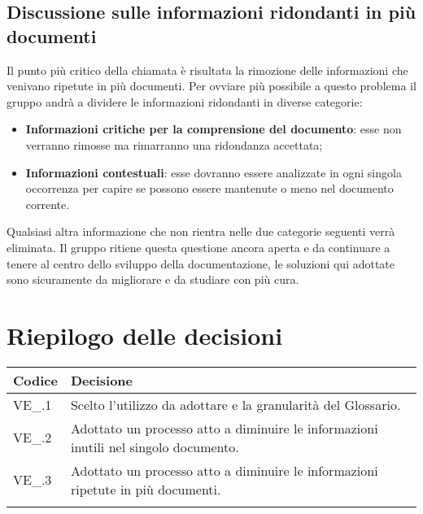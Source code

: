 \subsection{Discussione sulle informazioni ridondanti in più documenti}
Il punto più critico della chiamata è risultata la rimozione delle informazioni che venivano ripetute in più documenti. Per ovviare più possibile a questo problema il gruppo andrà a dividere le informazioni ridondanti in diverse categorie:
\begin{itemize}
	\item \textbf{Informazioni critiche per la comprensione del documento}: esse non verranno rimosse ma rimarranno una ridondanza accettata;
	\item \textbf{Informazioni contestuali}: esse dovranno essere analizzate in ogni singola occorrenza per capire se possono essere mantenute o meno nel documento corrente.
\end{itemize}
Qualsiasi altra informazione che non rientra nelle due categorie seguenti verrà eliminata.\newline
Il gruppo ritiene questa questione ancora aperta e da continuare a tenere al centro dello sviluppo della documentazione, le soluzioni qui adottate sono sicuramente da migliorare e da studiare con più cura.
\newpage

\section{Riepilogo delle decisioni \hfil}
{
	\setlength{\freewidth}{\dimexpr\textwidth-4\tabcolsep}
	\renewcommand{\arraystretch}{1.5}
	\setlength{\aboverulesep}{0pt}
	\setlength{\belowrulesep}{0pt}
	\begin{longtable}{L{.3\freewidth} L{.7\freewidth}}
		\toprule 
		\textbf{Codice} & \textbf{Decisione}\\
		\toprule
		\endhead

		VE\_\DataMeeting{}.1 & Scelto l'utilizzo da adottare e la granularità del Glossario. \\
		VE\_\DataMeeting{}.2 & Adottato un processo atto a diminuire le informazioni inutili nel singolo documento.\\
		VE\_\DataMeeting{}.3 & Adottato un processo atto a diminuire le informazioni ripetute in più documenti. \\
		\bottomrule
		\hiderowcolors
	\end{longtable}
}